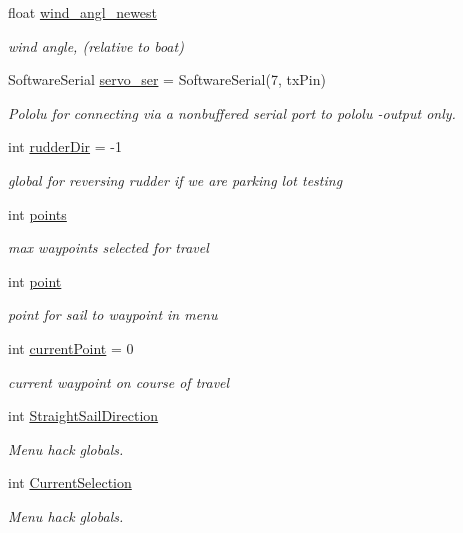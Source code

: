 \begin{DoxyCompactItemize}
float \hyperlink{group__group1_ga9fcee93bab7f0c81f67b99f8b8597e9c}{wind\-\_\-angl\-\_\-newest}
\begin{DoxyCompactList}\small\item\em wind angle, (relative to boat) \end{DoxyCompactList}\item 
\-Software\-Serial \hyperlink{group__group1_gad08dcd7d87414b8d7f7e9cf2689ea5d8}{servo\-\_\-ser} = \-Software\-Serial(7, tx\-Pin)
\begin{DoxyCompactList}\small\item\em \-Pololu for connecting via a nonbuffered serial port to pololu -\/output only. \end{DoxyCompactList}\item 
int \hyperlink{group__group1_gaf79de3204853b3b4101113683e74cd54}{rudder\-Dir} = -\/1
\begin{DoxyCompactList}\small\item\em global for reversing rudder if we are parking lot testing \end{DoxyCompactList}\item 
int \hyperlink{group__group1_gaf7f8f4a4e39e09fdb5e9f02330ecabef}{points}
\begin{DoxyCompactList}\small\item\em max waypoints selected for travel \end{DoxyCompactList}\item 
int \hyperlink{group__group1_ga2dee8b7fcecc7c2d190e9304b43ea886}{point}
\begin{DoxyCompactList}\small\item\em point for sail to waypoint in menu \end{DoxyCompactList}\item 
int \hyperlink{group__group1_ga9c43dea25777e23791d530b06f6715f1}{current\-Point} = 0
\begin{DoxyCompactList}\small\item\em current waypoint on course of travel \end{DoxyCompactList}\item 
int \hyperlink{group__group1_gac9d865c1411ae815f6b2394c45d604e7}{\-Straight\-Sail\-Direction}
\begin{DoxyCompactList}\small\item\em \-Menu hack globals. \end{DoxyCompactList}\item 
int \hyperlink{group__group1_ga79863a7d6b31d0c89c5050c2cd931cfe}{\-Current\-Selection}
\begin{DoxyCompactList}\small\item\em \-Menu hack globals. \end{DoxyCompactList}\item 

\end{DoxyCompactItemize}
